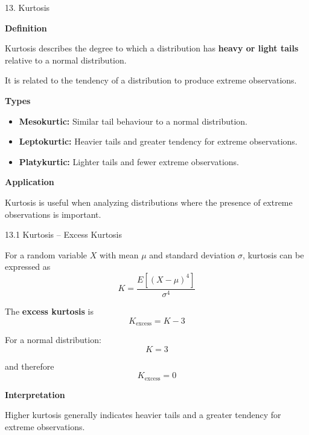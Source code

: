 
\begin{frame}{13. Kurtosis}

\textbf{Definition}

Kurtosis describes the degree to which a distribution has
\textbf{heavy or light tails} relative to a normal distribution.

\vspace{0.4cm}

It is related to the tendency of a distribution to produce
extreme observations.

\vspace{0.3cm}

\textbf{Types}

\begin{itemize}
    \item \textbf{Mesokurtic:} Similar tail behaviour to a normal distribution.
    
    \item \textbf{Leptokurtic:} Heavier tails and greater tendency
    for extreme observations.
    
    \item \textbf{Platykurtic:} Lighter tails and fewer extreme observations.
\end{itemize}

\vspace{0.3cm}

\textbf{Application}

Kurtosis is useful when analyzing distributions where the
presence of extreme observations is important.

\end{frame}



\begin{frame}{13.1 Kurtosis -- Excess Kurtosis}

For a random variable $X$ with mean $\mu$ and standard deviation
$\sigma$, kurtosis can be expressed as
\[
\boxed{
K=
\frac{E[(X-\mu)^4]}{\sigma^4}
}
\]

The \textbf{excess kurtosis} is
\[
\boxed{
K_{\text{excess}}=K-3
}
\]

For a normal distribution:
\[
K=3
\]

and therefore
\[
K_{\text{excess}}=0
\]

\vspace{0.1cm}

\textbf{Interpretation}

Higher kurtosis generally indicates heavier tails and a
greater tendency for extreme observations.

\end{frame}

